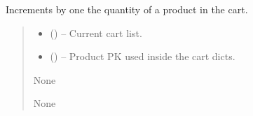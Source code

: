 \documentclass[a4paper,11pt,spanish]{sphinxmanual}
\begin{document}
\begin{fulllineitems}
\label{\detokenize{api/sale/sale.services:sale.services.increment_cart_item}}
\pysigstartsignatures
\pysiglinewithargsret
{}
{\sphinxparamcomma {}}
{}
\pysigstopsignatures
\sphinxAtStartPar
Increments by one the quantity of a product in the cart.
\begin{quote}\begin{description}
\begin{itemize}
\item {} 
\sphinxAtStartPar
{} (\sphinxstyleliteralemphasis{\sphinxupquote{{[}}}\sphinxstyleliteralemphasis{\sphinxupquote{{]}}}) – Current cart list.

\item {} 
\sphinxAtStartPar
{} () – Product PK used inside the cart dicts.

\end{itemize}

\sphinxAtStartPar
None

\sphinxAtStartPar
None

\end{description}\end{quote}

\end{fulllineitems}

\end{document}
